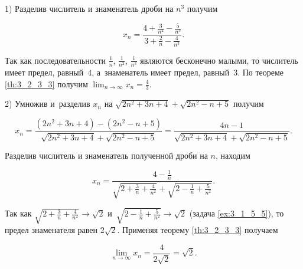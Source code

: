 1) Разделив числитель и знаменатель дроби на $n^{3}$
получим

\begin{equation*}
\displaystyle x_{n} =
\frac{4 + \frac{3}{n^{2}} - \frac{5}{n^{3}}}{3 + \frac{2}{n} - \frac{4}{n^{3}}}.
\end{equation*}

\noindent
Так как последовательности 
$\displaystyle \frac{1}{n}$,
$\displaystyle \frac{1}{n^{2}}$,
$\displaystyle \frac{1}{n^{3}}$
являются бесконечно малыми, то числитель имеет предел, равный~4,
а~знаменатель имеет предел, равный~3.
По теореме \ref{th:3_2_3_3} получим $\displaystyle \lim_{n \to \infty} x_{n} = \frac{4}{3}$.

2) Умножив и~разделив $x_{n}$ на
$\sqrt{2n^{2} + 3n + 4} + \sqrt{2n^{2} - n + 5}$
получим

\begin{equation*}
\displaystyle x_{n} = 
\frac{(2n^{2} + 3n + 4) - (2n^{2} - n + 5)}{\sqrt{2n^{2} + 3n + 4} + \sqrt{2n^{2} - n + 5}} =
\frac{4n -1}{\sqrt{2n^{2} + 3n + 4} + \sqrt{2n^{2} - n + 5}}.
\end{equation*}

\noindent
Разделив числитель и знаменатель полученной дроби на $n$, находим

\begin{equation*}
\displaystyle x_{n} = 
\frac
{4 - \frac{1}{n}}
{\sqrt{2 + \frac{3}{n} + \frac{4}{n^{2}}} + \sqrt{2 - \frac{1}{n} + \frac{5}{n^{2}}}}.
\end{equation*}

\noindent
Так как $\sqrt{2 + \frac{3}{n} + \frac{4}{n^{2}}} \to \sqrt{2}$
и~$\sqrt{2 - \frac{1}{n} + \frac{5}{n^{2}}} \to \sqrt{2}$
(задача \ref{ex:3_1_5_5}), то предел знаменателя равен $2\sqrt{2}$.
Применяя теорему \ref{th:3_2_3_3} получаем

\begin{equation*}
\displaystyle \lim_{n \to \infty} x_{n} = \frac{4}{2\sqrt{2}} = \sqrt{2}.
\end{equation*}

